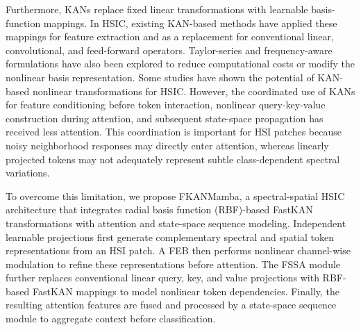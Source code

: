 \documentclass{ieeeaccess}
\begin{document}
Furthermore, KANs replace fixed linear transformations with learnable basis-function mappings. In HSIC, existing KAN-based methods have applied these mappings for feature extraction and as a replacement for conventional linear, convolutional, and feed-forward operators. Taylor-series and frequency-aware formulations have also been explored to reduce computational costs or modify the nonlinear basis representation. Some studies \cite{ref24,ref25,ref26,ref27,ref28} have shown the potential of KAN-based nonlinear transformations for HSIC. However, the coordinated use of KANs for feature conditioning before token interaction, nonlinear query-key-value construction during attention, and subsequent state-space propagation has received less attention. This coordination is important for HSI patches because noisy neighborhood responses may directly enter attention, whereas linearly projected tokens may not adequately represent subtle class-dependent spectral variations.

To overcome this limitation, we propose FKANMamba, a spectral-spatial HSIC architecture that integrates radial basis function (RBF)-based FastKAN transformations with attention and state-space sequence modeling. Independent learnable projections first generate complementary spectral and spatial token representations from an HSI patch. A FEB then performs nonlinear channel-wise modulation to refine these representations before attention. The FSSA module further replaces conventional linear query, key, and value projections with RBF-based FastKAN mappings to model nonlinear token dependencies. Finally, the resulting attention features are fused and processed by a state-space sequence module to aggregate context before classification.
\end{document}
